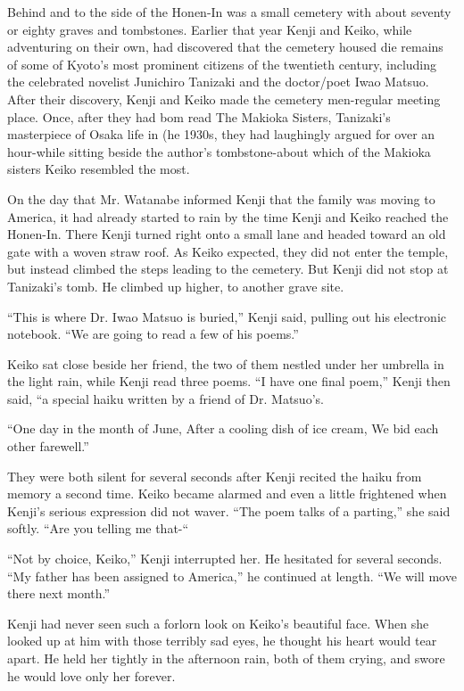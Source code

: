 \documentclass[]{article}
\begin{document}
{Behind and to the side of the Honen-In was a small cemetery with about seventy or eighty graves and tombstones.  Earlier that year Kenji and Keiko, while adventuring on their own, had discovered that the cemetery housed die remains of some of Kyoto’s most prominent citizens of the twentieth century, including the celebrated novelist Junichiro Tanizaki and the doctor/poet Iwao Matsuo.  After their discovery, Kenji and Keiko made the cemetery men-regular meeting place.  Once, after they had bom read The Makioka Sisters, Tanizaki’s masterpiece of Osaka life in (he 1930s, they had laughingly argued for over an hour-while sitting beside the author’s tombstone-about which of the Makioka sisters Keiko resembled the most.

On the day that Mr.  Watanabe informed Kenji that the family was moving to America, it had already started to rain by the time Kenji and Keiko reached the Honen-In.  There Kenji turned right onto a small lane and headed toward an old gate with a woven straw roof.  As Keiko expected, they did not enter the temple, but instead climbed the steps leading to the cemetery.  But Kenji did not stop at Tanizaki’s tomb.  He climbed up higher, to another grave site.

“This is where Dr.  Iwao Matsuo is buried,” Kenji said, pulling out his electronic notebook.  “We are going to read a few of his poems.”

Keiko sat close beside her friend, the two of them nestled under her umbrella in the light rain, while Kenji read three poems.  “I have one final poem,” Kenji then said, “a special haiku written by a friend of Dr.  Matsuo’s.

“One day in the month of June, After a cooling dish of ice cream, We bid each other farewell.”

They were both silent for several seconds after Kenji recited the haiku from memory a second time.  Keiko became alarmed and even a little frightened when Kenji’s serious expression did not waver.  “The poem talks of a parting,” she said softly.  “Are you telling me that-“

“Not by choice, Keiko,” Kenji interrupted her.  He hesitated for several seconds.  “My father has been assigned to America,” he continued at length.  “We will move there next month.”

Kenji had never seen such a forlorn look on Keiko’s beautiful face.  When she looked up at him with those terribly sad eyes, he thought his heart would tear apart.  He held her tightly in the afternoon rain, both of them crying, and swore he would love only her forever.


}
\end{document}
